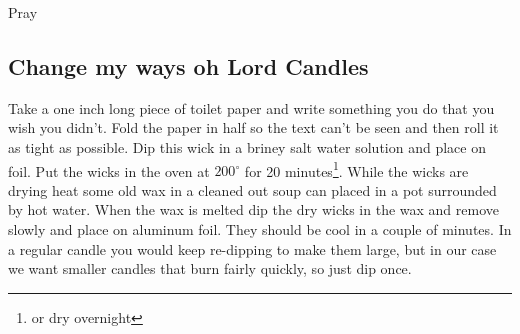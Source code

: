 
\noindent Pray

%
%
%
%

\subsection{Change my ways oh Lord Candles}

Take a one inch long piece of toilet paper and write something you do that you wish you didn't. Fold the paper in half so the text can't be seen and then roll it as tight as possible.  Dip this wick in a briney salt water solution and place on foil.  Put the wicks in the oven at $200^\circ$ for 20 minutes\footnote{or dry overnight}.  While the wicks are drying heat some old wax in a cleaned out soup can placed in a pot surrounded by hot water.  When the wax is melted dip the dry wicks in the wax and remove slowly and place on aluminum foil.  They should be cool in a couple of minutes.  In a regular candle you would keep re-dipping to make them large, but in our case we want smaller candles that burn fairly quickly, so just dip once.

